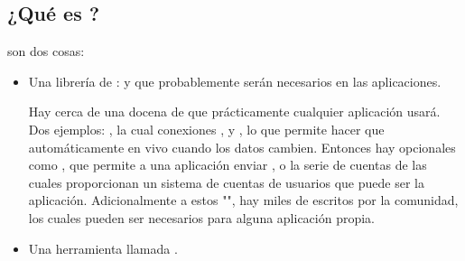 \subsection{¿Qué es \meteorNAME?}

\meteorNAME son dos cosas:
\begin{itemize}
	\item 
		Una librería de \packagesAS: \modulesAS \prewritten y \selfcontained que probablemente serán necesarios en las aplicaciones.

		Hay cerca de una docena de \packagesAS \coreAS \meteorNAME que prácticamente cualquier aplicación usará.  Dos ejemplos: \webapp, la cual \handleAS conexiones \incomming \httpNAME, y \templatingAS, lo que permite hacer \templatesAS \htmlNAME que automáticamente \update en vivo cuando los datos cambien. Entonces hay \packagesAS opcionales como \email, que permite a una aplicación enviar \emails, o la serie de cuentas de \meteorNAME las cuales proporcionan un sistema de cuentas de usuarios \fullFeatured que puede ser \droprightinto la aplicación. Adicionalmente a estos \packagesAS "\coreAS", hay miles de \packagesAS escritos por la comunidad, los cuales pueden ser necesarios para alguna aplicación propia.

	\item
		Una herramienta \commandLine llamada \commandLinemeteor.


\end{itemize}
